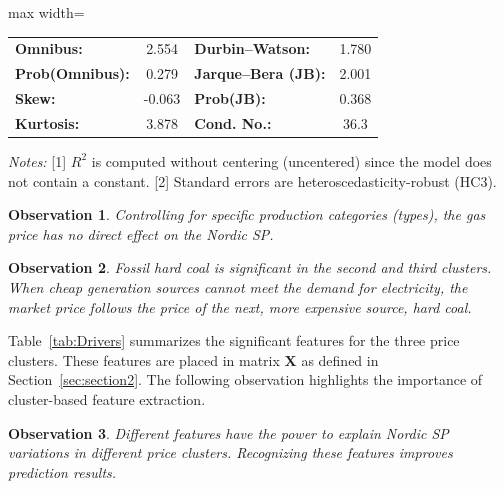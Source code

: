 \documentclass{article}
\newtheorem{observation}{Observation}
\begin{document}
\begin{table}[t]
\vspace{0.6em}

\begin{adjustbox}{max width=\textwidth}
\begin{tabular}{lclc}
\textbf{Omnibus:}       & 2.554 & \textbf{Durbin--Watson:}  & 1.780 \\
\textbf{Prob(Omnibus):} & 0.279 & \textbf{Jarque--Bera (JB):} & 2.001 \\
\textbf{Skew:}          & -0.063 & \textbf{Prob(JB):}       & 0.368 \\
\textbf{Kurtosis:}      & 3.878 & \textbf{Cond. No.:}       & 36.3 \\
\bottomrule
\end{tabular}
\end{adjustbox}

\footnotesize
\medskip

\emph{Notes:} [1] $R^2$ is computed without centering (uncentered) since the model does not contain a constant. [2] Standard errors are heteroscedasticity-robust (HC3).
\end{table}


\begin{observation} \label{observation2}
    Controlling for specific production categories (types), the gas price has no direct effect on the Nordic SP.
\end{observation}

\begin{observation} \label{observation3}
Fossil hard coal is significant in the second and third clusters. When cheap generation sources cannot meet the demand for electricity, the market price follows the price of the next, more expensive source, hard coal.
\end{observation}

Table~\ref{tab:Drivers} summarizes the significant features for the three price clusters. These features are placed in matrix $\textbf{X}$ as defined in Section~\ref{sec:section2}. The following observation highlights the importance of cluster-based feature extraction. 

\begin{observation} \label{observation4}
    Different features have the power to explain Nordic SP variations in different price clusters. Recognizing these features improves prediction results.
\end{observation}
\end{document}
